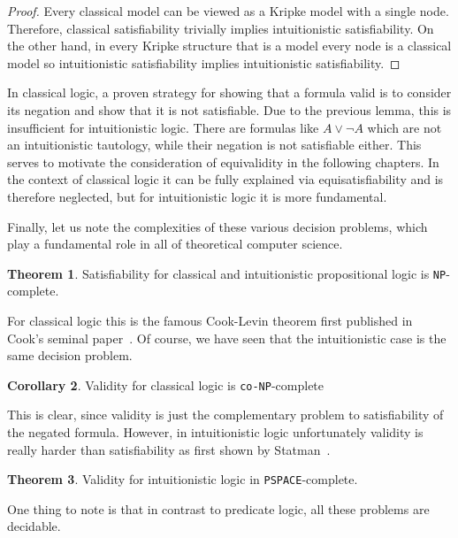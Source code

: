 \documentclass[a4paper,11pt]{report}
\theoremstyle{definition}
\newtheorem{theorem}{Theorem}[section]
\theoremstyle{definition}
\newtheorem{corollary}[theorem]{Corollary}
\theoremstyle{definition}
\theoremstyle{definition}
\theoremstyle{definition}
\theoremstyle{definition}
\theoremstyle{definition}
\begin{document}
	\begin{proof}
		Every classical model can be viewed as a Kripke model with a single node. Therefore, classical satisfiability trivially implies intuitionistic satisfiability.	On the other hand, in every Kripke structure that is a model every node is a classical model so intuitionistic satisfiability implies intuitionistic satisfiability.
	\end{proof}

	In classical logic, a proven strategy for showing that a formula valid is to consider its negation and show that it is not satisfiable. Due to the previous lemma, this is insufficient for intuitionistic logic. There are formulas like $A\vee\neg A$ which are not an intuitionistic tautology, while their negation is not satisfiable either. This serves to motivate the consideration of equivalidity in the following chapters. In the context of classical logic it can be fully explained via equisatisfiability and is therefore neglected, but for intuitionistic logic it is more fundamental.
	
	Finally, let us note the complexities of these various decision problems, which play a fundamental role in all of theoretical computer science.
	
	\begin{theorem}
		Satisfiability for classical and intuitionistic propositional logic is \verb+NP+-complete.
	\end{theorem}

	For classical logic this is the famous Cook-Levin theorem first published in Cook's seminal paper~\cite{cook1971complexity}. Of course, we have seen that the intuitionistic case is the same decision problem.
	
	\begin{corollary}
		Validity for classical logic is \verb+co-NP+-complete
	\end{corollary}

	This is clear, since validity is just the complementary problem to satisfiability of the negated formula. However, in intuitionistic logic unfortunately validity is really harder than satisfiability as first shown by Statman~\cite{statman1979intuitionistic}.
	
	\begin{theorem}
		Validity for intuitionistic logic in \verb+PSPACE+-complete.
	\end{theorem}

	One thing to note is that in contrast to predicate logic, all these problems are decidable.
	
\end{document}
